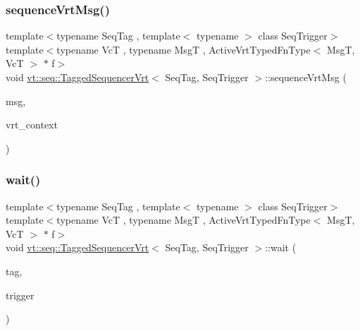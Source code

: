 \subsubsection{\texorpdfstring{sequence\+Vrt\+Msg()}{sequenceVrtMsg()}}
{\footnotesize\ttfamily template$<$typename Seq\+Tag , template$<$ typename $>$ class Seq\+Trigger$>$ \\
template$<$typename VcT , typename MsgT , Active\+Vrt\+Typed\+Fn\+Type$<$ Msg\+T, Vc\+T $>$ $\ast$ f$>$ \\
void \hyperlink{structvt_1_1seq_1_1_tagged_sequencer_vrt}{vt\+::seq\+::\+Tagged\+Sequencer\+Vrt}$<$ Seq\+Tag, Seq\+Trigger $>$\+::sequence\+Vrt\+Msg (\begin{DoxyParamCaption}\item[{MsgT $\ast$}]{msg,  }\item[{VcT $\ast$}]{vrt\+\_\+context }\end{DoxyParamCaption})}

\mbox{\label{structvt_1_1seq_1_1_tagged_sequencer_vrt_a8897cf74185e38e4d6b222bdab539f31}} 
\subsubsection{\texorpdfstring{wait()}{wait()}\hspace{0.1cm}{\footnotesize\ttfamily [1/2]}}
{\footnotesize\ttfamily template$<$typename Seq\+Tag , template$<$ typename $>$ class Seq\+Trigger$>$ \\
template$<$typename VcT , typename MsgT , Active\+Vrt\+Typed\+Fn\+Type$<$ Msg\+T, Vc\+T $>$ $\ast$ f$>$ \\
void \hyperlink{structvt_1_1seq_1_1_tagged_sequencer_vrt}{vt\+::seq\+::\+Tagged\+Sequencer\+Vrt}$<$ Seq\+Tag, Seq\+Trigger $>$\+::wait (\begin{DoxyParamCaption}\item[{\hyperlink{namespacevt_a84ab281dae04a52a4b243d6bf62d0e52}{Tag\+Type} const \&}]{tag,  }\item[{\hyperlink{structvt_1_1seq_1_1_tagged_sequencer_a4b015f2f7d3197a66af5576f0e63a834}{Seq\+Trigger\+Type}$<$ MsgT, VcT $>$}]{trigger }\end{DoxyParamCaption})}

\mbox{\label{structvt_1_1seq_1_1_tagged_sequencer_vrt_a88706e19289453ba99602e50dff901dd}} 
